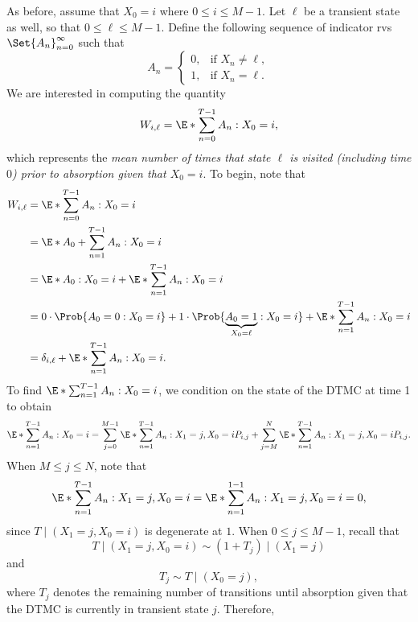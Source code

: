 \begin{Regular}
    As before, assume that $X_{0}=i$ where $0 \leq i \leq M-1$. Let $\ell$ be a transient state as well, so that $0 \leq \ell \leq M-1$.
    Define the following sequence of indicator rvs $ \Set{A_n}_{n=0}^\infty $ such that
    \[ A_{n}= \begin{cases}
            0, & \text{if $X_{n} \neq \ell$}, \\
            1, & \text{if $X_{n}=\ell$}.
        \end{cases} \]
    We are interested in computing the quantity
    \[ W_{i,\ell}=\E*{\sum_{n=0}^{T-1} A_n\given X_0=i}, \]
    which represents the \emph{mean number of times that state $ \ell $ is visited (including time $0$) prior to
        absorption given that $ X_0=i $}. To begin, note that
    \begin{align*}
        W_{i, \ell}
         & =\E*{\sum_{n=0}^{T-1} A_{n} \given X_{0}=i}                                                                                                       \\
         & =\E*{A_{0}+\sum_{n=1}^{T-1} A_{n} \given X_{0}=i}                                                                                                 \\
         & =\E*{A_{0} \given X_{0}=i}+\E*{\sum_{n=1}^{T-1} A_{n} \given X_{0}=i}                                                                             \\
         & =0 \cdot \Prob{A_{0}=0 \given X_{0}=i}+1 \cdot \Prob{\underbrace{A_{0}=1}_{X_{0}=\ell} \given X_{0}=i}+\E*{\sum_{n=1}^{T-1} A_{n} \given X_{0}=i} \\
         & =\delta_{i, \ell}+\E*{\sum_{n=1}^{T-1} A_{n} \given X_{0}=i} .
    \end{align*}
    To find $\E*{\sum_{n=1}^{T-1} A_{n} \given X_{0}=i}$, we condition on the state of the DTMC at time 1 to obtain
    \[
        \E*{\sum_{n=1}^{T-1} A_{n} \given X_{0}=i}
        =\sum_{j=0}^{M-1} \E*{\sum_{n=1}^{T-1} A_{n} \given X_{1}=j, X_{0}=i} P_{i, j}
        +\sum_{j=M}^{N} \E*{\sum_{n=1}^{T-1} A_{n} \given X_{1}=j, X_{0}=i} P_{i, j}.
    \]
    When $M \leq j \leq N$, note that
    \[
        \E*{\sum_{n=1}^{T-1} A_{n} \given X_{1}=j, X_{0}=i}=\E*{\sum_{n=1}^{1-1} A_{n} \given X_{1}=j, X_{0}=i}=0,
    \]
    since $T \mid(X_{1}=j, X_{0}=i)$ is degenerate at $1$.
    When $0 \leq j \leq M-1$, recall that
    \[
        T\mid(X_{1}=j, X_{0}=i) \sim(1+T_{j})\mid(X_{1}=j)
    \]
    and
    \[
        T_{j} \sim T \mid(X_{0}=j),
    \]
    where $T_{j}$ denotes the remaining number of transitions until absorption given that the DTMC is currently in transient state $j$. Therefore,

\end{Regular}
